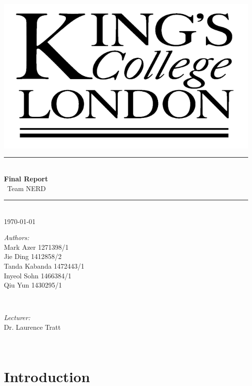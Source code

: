 \documentclass[11pt]{article}
\begin{document}
	\begin{titlepage}
	\center
	\newcommand{\HRule}{\rule{\linewidth}{0.5mm}} 
\includegraphics[scale=0.2]{kingslogo}\\
\HRule \\[0.4cm]
{ \huge \bfseries Final Report}\\[0.4cm] %
	\ Team NERD
\HRule \\[1.5cm]
{\large \today}\\[10cm] 
	

\begin{minipage}{0.4\textwidth}
	\begin{flushleft} \large
		\emph{Authors:}\\
			Mark Azer 1271398/1\\
			Jie Ding 1412858/2 \\
			Tanda Kabanda 1472443/1 \\
			Inyeol Sohn 1466384/1 \\
			Qiu Yun 1430295/1 \\
	\end{flushleft}
\end{minipage}
~
\begin{minipage}{0.4\textwidth}
	\begin{flushright} \large
		\emph{Lecturer:} \\
		Dr. Laurence Tratt
	\end{flushright}
\end{minipage}\\[4cm]
	
	\end{titlepage}
	\tableofcontents
	
	\section{Introduction} %
\end{document}
